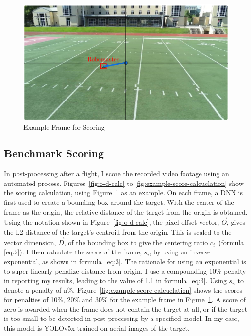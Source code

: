 \begin{figure}
\centering
\includegraphics[width=0.9\linewidth]{chapter6/FIGS/fig-tracking-score-demo.png}
\caption{Example Frame for Scoring}
\label{fig:track-score-example}
\end{figure}

\subsection{Benchmark Scoring}
\label{sec:tracking-scoring}
In post-processing after a flight, I score the recorded video footage
using an automated process.  Figures~\ref{fig:o-d-calc} to
\ref{fig:example-score-calcuclation} show the scoring calculation,
using Figure~\ref{fig:track-score-example} as an example.  On each
frame, a DNN is first used to create a bounding box around the target.
With the center of the frame as the origin, the relative distance of
the target from the origin is obtained.  Using the notation shown in
Figure~\ref{fig:o-d-calc}, the pixel offset vector, $\vec{O}$, gives
the L2 distance of the target's centroid from the origin.  This is scaled
to the vector dimension, $\vec{D}$, of the bounding box to give the
centering ratio $c_i$~(formula \ref{eq:2}).  I then calculate the
score of the frame, $s_i$, by using an inverse exponential, as shown
in formula~\ref{eq:3}.  The rationale for using an exponential is to
super-linearly penalize distance from origin.  I use a compounding
10\% penalty in reporting my results, leading to the value of 1.1 in
formula~\ref{eq:3}.  Using $s_n$ to denote a penalty of n\%,
Figure~\ref{fig:example-score-calcuclation} shows the scores for
penalties of 10\%, 20\% and 30\% for the example frame in
Figure~\ref{fig:track-score-example}.  A score of zero is awarded when
the frame does not contain the target at all, or if the target is too
small to be detected in post-processing by a specified model.  In my
case, this model is YOLOv5x trained on aerial images of the target.

